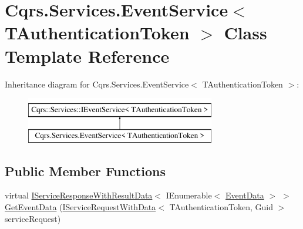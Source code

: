 \hypertarget{classCqrs_1_1Services_1_1EventService}{}\section{Cqrs.\+Services.\+Event\+Service$<$ T\+Authentication\+Token $>$ Class Template Reference}
\label{classCqrs_1_1Services_1_1EventService}
Inheritance diagram for Cqrs.\+Services.\+Event\+Service$<$ T\+Authentication\+Token $>$\+:\begin{figure}[H]
\begin{center}
\leavevmode
\includegraphics[height=2.000000cm]{classCqrs_1_1Services_1_1EventService}
\end{center}
\end{figure}
\subsection*{Public Member Functions}
\begin{DoxyCompactItemize}
\item 
virtual \hyperlink{interfaceCqrs_1_1Services_1_1IServiceResponseWithResultData}{I\+Service\+Response\+With\+Result\+Data}$<$ I\+Enumerable$<$ \hyperlink{classCqrs_1_1Events_1_1EventData}{Event\+Data} $>$ $>$ \hyperlink{classCqrs_1_1Services_1_1EventService_a9a68d774ac754e39be56d3e0449f14d7_a9a68d774ac754e39be56d3e0449f14d7}{Get\+Event\+Data} (\hyperlink{interfaceCqrs_1_1Services_1_1IServiceRequestWithData}{I\+Service\+Request\+With\+Data}$<$ T\+Authentication\+Token, Guid $>$ service\+Request)
\end{DoxyCompactItemize}
